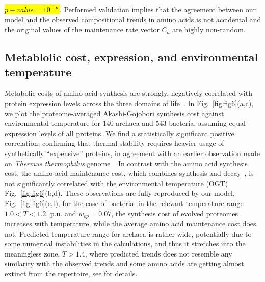 \documentclass[10pt,letterpaper]{article}
\begin{document}
\hl{$p-value=10^{-\infty}$}. Performed validation implies that the agreement between our model and the observed compositional trends in amino acids is not accidental and the original values of the maintenance rate vector $C_{a}$ are highly non-random.





\subsection{Metablolic cost, expression, and environmental temperature}

Metabolic costs of amino acid synthesis are strongly, negatively correlated with protein expression levels across the three domains of life~\cite{Akashi2002Metabolic,Swire2007Selection}.  In Fig.~\ref{fig:fig6}(a,c), we plot the proteome-averaged Akashi-Gojobori synthesis cost against environmental temperature for 140 archaea and 543 bacteria, assuming equal expression levels of all proteins. We find a statistically significant positive correlation, confirming that thermal stability requires heavier usage of synthetically ``expensive'' proteins, in agreement with an earlier observation made on {\it Thermus thermophilus} genome~\cite{Swire2007Selection}. In contrast with the amino acid synthesis cost, the amino acid maintenance cost, which combines synthesis and decay~\cite{Krick2014Amino}, is not significantly correlated with the environmental temperature (OGT) Fig.~\ref{fig:fig6}(b,d). These observations are fully reproduced by our model, Fig.~\ref{fig:fig6}(e,f), for the case of bacteria: in the relevant temperature range $1.0 < T < 1.2$, p.u. and $w_{op}=0.07$, the synthesis cost of evolved proteomes increases with temperature, while the average amino acid maintenance cost does not. Predicted temperature range for archaea is rather wide, potentially due to some numerical instabilities in the calculations, and thus it stretches into the meaningless zone, $T > 1.4$, where predicted trends does not resemble any similarity with the observed trends and some amino acids are getting almost extinct from the repertoire, see  for details.
\end{document}
